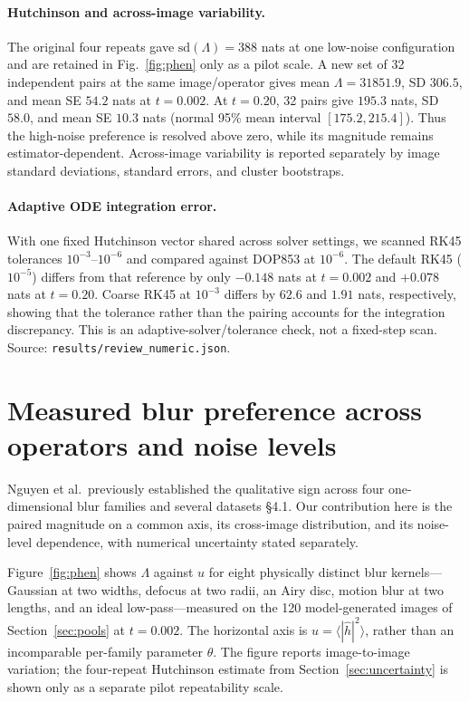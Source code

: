 \documentclass[10pt,journal]{IEEEtran}
\newcommand{\Lam}{\Lambda}
\begin{document}
\paragraph*{Hutchinson and across-image variability.}
The original four repeats gave $\mathrm{sd}(\Lam)=388$ nats at one low-noise configuration and
are retained in Fig.~\ref{fig:phen} only as a pilot scale. A new set of 32 independent pairs at
the same image/operator gives mean $\Lam=31851.9$, SD $306.5$, and mean SE $54.2$ nats at
$t=0.002$. At $t=0.20$, 32 pairs give $195.3$ nats, SD $58.0$, and mean SE $10.3$ nats
(normal 95\% mean interval $[175.2,215.4]$). Thus the high-noise preference is resolved above
zero, while its magnitude remains estimator-dependent. Across-image variability is reported
separately by image standard deviations, standard errors, and cluster bootstraps.

\paragraph*{Adaptive ODE integration error.}
With one fixed Hutchinson vector shared across solver settings, we scanned RK45 tolerances
$10^{-3}$--$10^{-6}$ and compared against DOP853 at $10^{-6}$. The default RK45
($10^{-5}$) differs from that reference by only $-0.148$ nats at $t=0.002$ and $+0.078$ nats
at $t=0.20$. Coarse RK45 at $10^{-3}$ differs by $62.6$ and $1.91$ nats, respectively, showing
that the tolerance rather than the pairing accounts for the integration discrepancy. This is an
adaptive-solver/tolerance check, not a fixed-step scan. Source:
\texttt{results/review\_numeric.json}.

\section{Measured blur preference across operators and noise levels}
\label{sec:phen}

Nguyen et al.\ previously established the qualitative sign across four one-dimensional blur
families and several datasets \cite{nguyen2025morsebott}\S4.1. Our contribution here is the
paired magnitude on a common axis, its cross-image distribution, and its noise-level
dependence, with numerical uncertainty stated separately.

Figure~\ref{fig:phen} shows $\Lam$ against $u$ for eight physically distinct blur kernels---
Gaussian at two widths, defocus at two radii, an Airy disc, motion blur at two lengths, and an
ideal low-pass---measured on the 120 model-generated images of Section~\ref{sec:pools} at
$t=0.002$. The horizontal axis is
$u=\langle|\hat h|^2\rangle$, rather than an incomparable per-family parameter $\theta$. The
figure reports image-to-image variation; the four-repeat Hutchinson estimate from
Section~\ref{sec:uncertainty} is shown only as a separate pilot repeatability scale.
\end{document}
